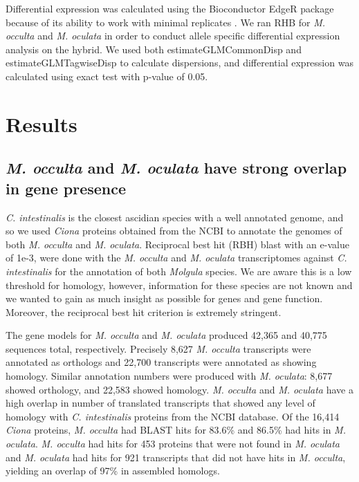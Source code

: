 Differential expression was calculated using the Bioconductor EdgeR package because of its ability to work with minimal replicates \cite{robinson_edger:_2010}. We ran RHB  for \textit{M. occulta} and \textit{M. oculata} in order to conduct allele specific differential expression analysis on the hybrid. We used both estimateGLMCommonDisp and estimateGLMTagwiseDisp to calculate dispersions, and differential expression was calculated using exact test with p-value of 0.05. 

\section{Results}
\subsection{\textit{M. occulta} and \textit{M. oculata} have strong overlap in gene presence}
\textit{C. intestinalis} is the closest ascidian species with a well annotated genome, and so we used \textit{Ciona} proteins obtained from the NCBI to annotate the genomes of both \textit{M. occulta} and \textit{M. oculata}. Reciprocal best hit (RBH) blast with an e-value of 1e-3, were done with the \textit{M. occulta} and \textit{M. oculata} transcriptomes against \textit{C. intestinalis} for the annotation of both \textit{Molgula} species.  We are aware this is a low threshold for homology, however, information for these species are not known and we wanted to gain as much insight as possible for genes and gene function. Moreover, the reciprocal best hit criterion is extremely stringent.

The gene models for \textit{M. occulta} and \textit{M. oculata} produced 42,365 and 40,775 sequences total, respectively. Precisely 8,627 \textit{M. occulta} transcripts were annotated as orthologs and 22,700 transcripts were annotated as showing homology. Similar annotation numbers were produced with \textit{M. oculata}: 8,677 showed orthology, and 22,583 showed homology. \textit{M. occulta} and \textit{M. oculata} have a high overlap in number of translated transcripts that showed any level of homology with \textit{C. intestinalis} proteins from the NCBI database. Of the 16,414 {\em Ciona} proteins, \textit{M. occulta} had BLAST hits for 83.6\% and 86.5\% had hits in \textit{M. oculata}. \textit{M. occulta} had hits for 453 proteins that were not found in \textit{M. oculata} and \textit{M. oculata} had hits for 921 transcripts that did not have hits in \textit{M. occulta}, yielding an overlap of 97\% in assembled homologs.

